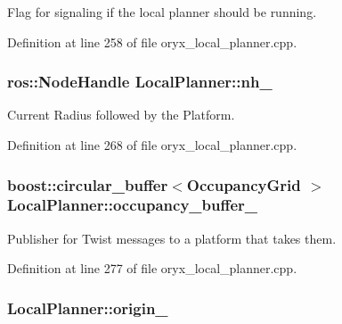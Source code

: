 \-Flag for signaling if the local planner should be running. 



\-Definition at line 258 of file oryx\-\_\-local\-\_\-planner.\-cpp.

\subsubsection[{nh\-\_\-}]{\setlength{\rightskip}{0pt plus 5cm}ros\-::\-Node\-Handle {\bf \-Local\-Planner\-::nh\-\_\-}\hspace{0.3cm}{\ttfamily  [private]}}\label{classLocalPlanner_aa5ea5044555101033c5b1795c5f9cf3f}


\-Current \-Radius followed by the \-Platform. 



\-Definition at line 268 of file oryx\-\_\-local\-\_\-planner.\-cpp.

\subsubsection[{occupancy\-\_\-buffer\-\_\-}]{\setlength{\rightskip}{0pt plus 5cm}boost\-::circular\-\_\-buffer$<${\bf \-Occupancy\-Grid} $>$ {\bf \-Local\-Planner\-::occupancy\-\_\-buffer\-\_\-}\hspace{0.3cm}{\ttfamily  [private]}}\label{classLocalPlanner_a07707d65004db2f3812fbe6e14bbdaa1}


\-Publisher for \-Twist messages to a platform that takes them. 



\-Definition at line 277 of file oryx\-\_\-local\-\_\-planner.\-cpp.

\subsubsection[{origin\-\_\-}]{ {\bf \-Local\-Planner\-::origin\-\_\-}\hspace{0.3cm}{\ttfamily  [private]}}\label{classLocalPlanner_ad8e9ea5ce805a9c92b054353b6fe00d7}


